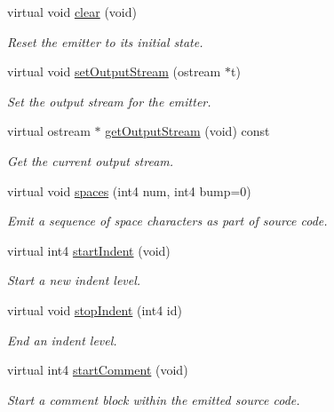 \begin{DoxyCompactItemize}
virtual void \mbox{\hyperlink{class_emit_pretty_print_aaffabdb012376ddeacebbb0463b7ad79}{clear}} (void)
\begin{DoxyCompactList}\small\item\em Reset the emitter to its initial state. \end{DoxyCompactList}\item 
virtual void \mbox{\hyperlink{class_emit_pretty_print_a049d0fd7579b85ec08321f08db93caad}{set\+Output\+Stream}} (ostream $\ast$t)
\begin{DoxyCompactList}\small\item\em Set the output stream for the emitter. \end{DoxyCompactList}\item 
virtual ostream $\ast$ \mbox{\hyperlink{class_emit_pretty_print_a599c4cdff19adb310a2a6a4109c4712a}{get\+Output\+Stream}} (void) const
\begin{DoxyCompactList}\small\item\em Get the current output stream. \end{DoxyCompactList}\item 
virtual void \mbox{\hyperlink{class_emit_pretty_print_aef02e9261ce7b7a96bceeae169512a3f}{spaces}} (int4 num, int4 bump=0)
\begin{DoxyCompactList}\small\item\em Emit a sequence of space characters as part of source code. \end{DoxyCompactList}\item 
virtual int4 \mbox{\hyperlink{class_emit_pretty_print_a3c08c45b256a71e9e93864dd7ef4860b}{start\+Indent}} (void)
\begin{DoxyCompactList}\small\item\em Start a new indent level. \end{DoxyCompactList}\item 
virtual void \mbox{\hyperlink{class_emit_pretty_print_a9804f4ea2076b47333f02697b23e77f2}{stop\+Indent}} (int4 id)
\begin{DoxyCompactList}\small\item\em End an indent level. \end{DoxyCompactList}\item 
virtual int4 \mbox{\hyperlink{class_emit_pretty_print_a922f3833eb9fd5f0aa04f2d0fe3e3540}{start\+Comment}} (void)
\begin{DoxyCompactList}\small\item\em Start a comment block within the emitted source code. \end{DoxyCompactList}\item 

\end{DoxyCompactItemize}
